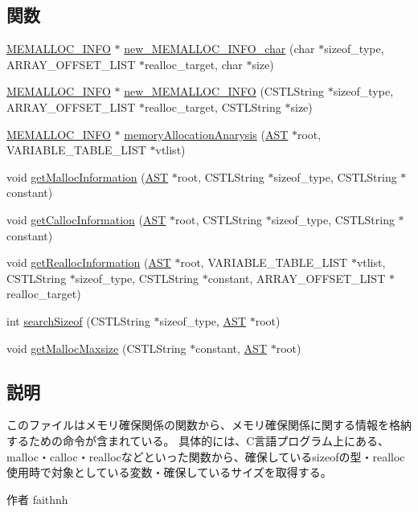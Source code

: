\subsection*{関数}
\begin{DoxyCompactItemize}
\item 
\hyperlink{structmemory__allocation__info}{MEMALLOC\_\-INFO} $\ast$ \hyperlink{MemallocInfo_8h_afe34555376d69246b3a082014cad78af}{new\_\-MEMALLOC\_\-INFO\_\-char} (char $\ast$sizeof\_\-type, ARRAY\_\-OFFSET\_\-LIST $\ast$realloc\_\-target, char $\ast$size)
\item 
\hyperlink{structmemory__allocation__info}{MEMALLOC\_\-INFO} $\ast$ \hyperlink{MemallocInfo_8h_aed5ea9294b1778c648246294a76b4c6b}{new\_\-MEMALLOC\_\-INFO} (CSTLString $\ast$sizeof\_\-type, ARRAY\_\-OFFSET\_\-LIST $\ast$realloc\_\-target, CSTLString $\ast$size)
\item 
\hyperlink{structmemory__allocation__info}{MEMALLOC\_\-INFO} $\ast$ \hyperlink{MemallocInfo_8h_a1ce27f7b14a1ba76647f0d8dc0cca30e}{memoryAllocationAnarysis} (\hyperlink{structabstract__syntax__tree}{AST} $\ast$root, VARIABLE\_\-TABLE\_\-LIST $\ast$vtlist)
\item 
void \hyperlink{MemallocInfo_8h_a44daa61bf2a56ae7b5a29e7b43dd0e2a}{getMallocInformation} (\hyperlink{structabstract__syntax__tree}{AST} $\ast$root, CSTLString $\ast$sizeof\_\-type, CSTLString $\ast$constant)
\item 
void \hyperlink{MemallocInfo_8h_a6660d813f42687f1cc9f1fecf1f16ef0}{getCallocInformation} (\hyperlink{structabstract__syntax__tree}{AST} $\ast$root, CSTLString $\ast$sizeof\_\-type, CSTLString $\ast$constant)
\item 
void \hyperlink{MemallocInfo_8h_adc8171dd663897d8dbaea3d837453242}{getReallocInformation} (\hyperlink{structabstract__syntax__tree}{AST} $\ast$root, VARIABLE\_\-TABLE\_\-LIST $\ast$vtlist, CSTLString $\ast$sizeof\_\-type, CSTLString $\ast$constant, ARRAY\_\-OFFSET\_\-LIST $\ast$realloc\_\-target)
\item 
int \hyperlink{MemallocInfo_8h_a4db917a362836842caf646ada69b38b8}{searchSizeof} (CSTLString $\ast$sizeof\_\-type, \hyperlink{structabstract__syntax__tree}{AST} $\ast$root)
\item 
void \hyperlink{MemallocInfo_8h_a0f47635fa5f6ec3f88df9d13f3facc85}{getMallocMaxsize} (CSTLString $\ast$constant, \hyperlink{structabstract__syntax__tree}{AST} $\ast$root)
\end{DoxyCompactItemize}


\subsection{説明}
このファイルはメモリ確保関係の関数から、メモリ確保関係に関する情報を格納するための命令が含まれている。 具体的には、C言語プログラム上にある、malloc・calloc・reallocなどといった関数から、確保しているsizeofの型・realloc使用時で対象としている変数・確保しているサイズを取得する。 \begin{DoxyAuthor}{作者}
faithnh 
\end{DoxyAuthor}


